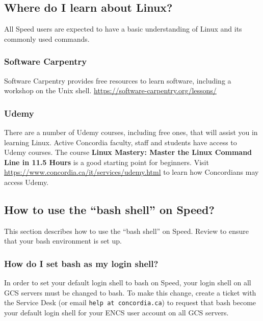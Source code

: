
\subsection{Where do I learn about Linux?}
All Speed users are expected to have a basic understanding of Linux and 
its commonly used commands.

\subsubsection*{Software Carpentry}
Software Carpentry provides free resources to learn software, including a 
workshop on the Unix shell. \url{https://software-carpentry.org/lessons/} 

\subsubsection*{Udemy}
There are a number of Udemy courses, including free ones, that will assist 
you in learning Linux. Active Concordia faculty, staff and students have 
access to Udemy courses. The course \textbf{Linux Mastery: Master the Linux 
Command Line in 11.5 Hours} is a good starting point for beginners. Visit
\url{https://www.concordia.ca/it/services/udemy.html} to learn how Concordians 
may access Udemy.

\subsection{How to use the ``bash shell'' on Speed?}
This section describes how to use the ``bash shell'' on Speed. Review
 to ensure that your bash environment is set up.

\subsubsection{How do I set bash as my login shell?}
In order to set your default login shell to bash on Speed, your login shell on all GCS servers must be changed to bash.
To make this change, create a ticket with the Service Desk (or email \texttt{help at concordia.ca}) to
request that bash become your default login shell for your ENCS user account on all GCS servers.

